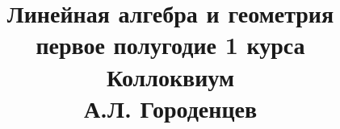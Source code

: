 \documentclass[fleqn]{article}
\title{Линейная алгебра и геометрия \\ первое полугодие 1 курса \\ Коллоквиум \\ А.Л. Городенцев}
\begin{document}
	\maketitle
	\pagebreak
	
	
	\tableofcontents
	
	\newpage
	
			
\end{document}
